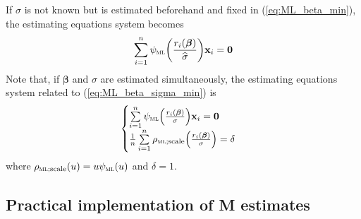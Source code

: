 If $\sigma$ is not known but is estimated beforehand and fixed in
(\ref{eq:ML_beta_min}), the estimating equations system becomes
\[
    \sum_{i=1}^{n} \psi_{\stsc{ML}}\left(\frac{r_{i}(\boldsymbol\beta)}{\sthat{\sigma}}\right) \stvec{x}_{i} = \mathbf{0}
\]
Note that, if $\boldsymbol\beta$ and $\sigma$ are estimated simultaneously,
the estimating equations system related to (\ref{eq:ML_beta_sigma_min}) is
%
\begin{equation}\label{eq:ML_beta_sigma_equations}
    \begin{cases}
        \sum\limits_{i=1}^{n} \psi_{\stsc{ML}}\left(\frac{r_{i}(\boldsymbol\beta)}{\sigma}\right) \stvec{x}_{i} = \mathbf{0}\\
        \frac{1}{n} \sum\limits_{i=1}^{n} \rho_{\stsc{ML};\mathrm{scale}}\left(\frac{r_{i}(\boldsymbol\beta)}{\sigma}\right) = \delta
    \end{cases}
\end{equation}
%
where $\rho_{\stsc{ML};\mathrm{scale}}(u) = u\psi_{\stsc{ML}}(u)$ and
$\delta=1$.

\subsection{Practical implementation of M estimates}
\label{subsec:practical_implementation_Mestimate}

